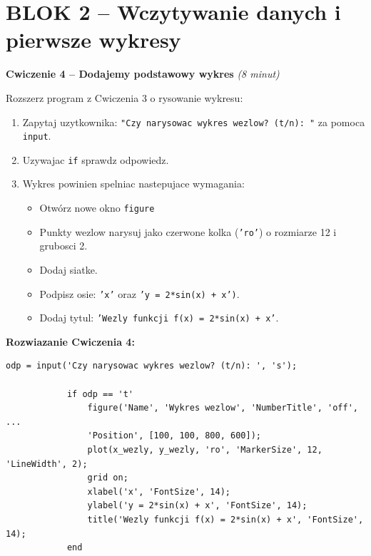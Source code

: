 \documentclass[12pt,a4paper]{article}
\begin{document}
	\newpage
	\section*{\textcolor{headerblue}{BLOK 2 -- Wczytywanie danych i pierwsze wykresy}}
	
	\begin{cwiczeniebox}
		\textbf{Cwiczenie 4 -- Dodajemy podstawowy wykres} \quad \textit{(8 minut)}
		
		Rozszerz program z Cwiczenia 3 o rysowanie wykresu:
		
		\begin{enumerate}[leftmargin=*,itemsep=2pt]
			\item Zapytaj uzytkownika: \texttt{"Czy narysowac wykres wezlow? (t/n): "} za pomoca \texttt{input}.
			\item Uzywajac \texttt{if} sprawdz odpowiedz.
			\item Wykres powinien spelniac nastepujace wymagania:
			\begin{itemize}
				\item Otwórz nowe okno \texttt{figure}
				\item Punkty wezlow narysuj jako czerwone kolka (\texttt{'ro'}) o rozmiarze 12 i grubosci 2.
				\item Dodaj siatke.
				\item Podpisz osie: \texttt{'x'} oraz \texttt{'y = 2*sin(x) + x')}.
				\item Dodaj tytul: \texttt{'Wezly funkcji f(x) = 2*sin(x) + x'}.
			\end{itemize}
		\end{enumerate}
	\end{cwiczeniebox}
	
	\newpage
	\begin{rozwiazaniebox}
		\textbf{Rozwiazanie Cwiczenia 4:}
		\begin{lstlisting}[caption={Cwiczenie 4 - Podstawowy wykres}]
			odp = input('Czy narysowac wykres wezlow? (t/n): ', 's');
			
			if odp == 't'
				figure('Name', 'Wykres wezlow', 'NumberTitle', 'off', ...
				'Position', [100, 100, 800, 600]);
				plot(x_wezly, y_wezly, 'ro', 'MarkerSize', 12, 'LineWidth', 2);
				grid on;
				xlabel('x', 'FontSize', 14);
				ylabel('y = 2*sin(x) + x', 'FontSize', 14);
				title('Wezly funkcji f(x) = 2*sin(x) + x', 'FontSize', 14);
			end
		\end{lstlisting}
	\end{rozwiazaniebox}
	
\end{document}
